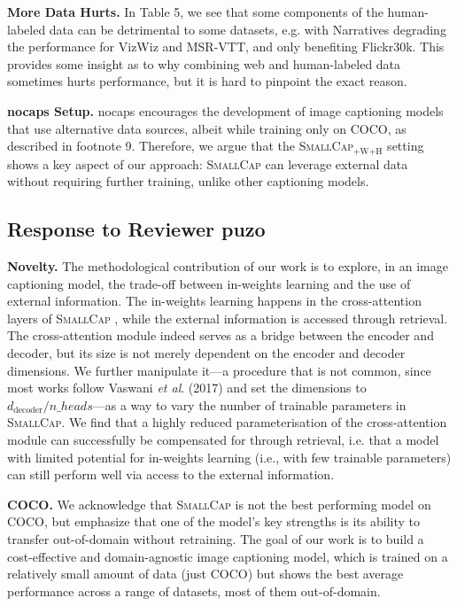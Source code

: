 \documentclass[10pt,twocolumn,letterpaper]{article}
\newcommand{\model}{\textsc{SmallCap}\xspace}
\begin{document}
\textbf{More Data Hurts.} In Table 5, we see that some components of the human-labeled data can be detrimental to some datasets, e.g. with Narratives degrading the performance for VizWiz and MSR-VTT, and only benefiting Flickr30k. This provides some insight as to why combining web and human-labeled data sometimes hurts performance, but it is hard to pinpoint the exact reason. 

\textbf{nocaps Setup.} nocaps encourages the development of image captioning models that use alternative data sources, albeit while training only on COCO, as described in footnote 9. Therefore, we argue that the \model{}$_{\text{+W+H}}$ setting shows a key aspect of our approach: \model can leverage external data without requiring further training, unlike other captioning models. 


\subsection{Response to Reviewer puzo}%

\textbf{Novelty.} The methodological contribution of our work is to explore, in an image captioning model, the trade-off between in-weights learning and the use of external information. The in-weights learning happens in the cross-attention layers of \model%
, while the external information is accessed through retrieval. The cross-attention module indeed serves as a bridge between the encoder and decoder, but its size is not merely dependent on the encoder and decoder dimensions. We further manipulate it---a procedure that is not common, since most works follow Vaswani \textit{et al}. (2017) and set the dimensions to $d_{\text{decoder}}/n\_heads$---as a way to vary the number of trainable parameters in \model. We find that a highly reduced parameterisation of the cross-attention module can successfully be compensated for through retrieval, i.e. that a model with limited potential for in-weights learning (i.e., with few trainable parameters) can still perform well via access to the external information.

\textbf{COCO.} We acknowledge that \model is not the best performing model on COCO, but emphasize that one of the model's key strengths is its ability to transfer out-of-domain without retraining. The goal of our work is to build a cost-effective and domain-agnostic image captioning model, which is trained on a relatively small amount of data (just COCO) but shows the best average performance across a range of datasets, most of them out-of-domain.
\end{document}
